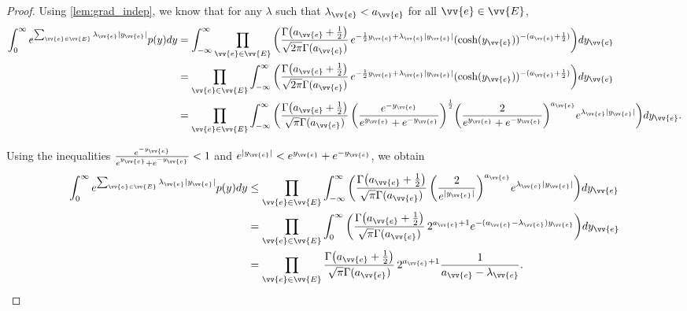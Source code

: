 \documentclass[a4paper, 11pt]{article}
\begin{document}
\begin{proof}

Using \cref{lem:grad_indep}, we know that for any $\lambda$ such that $\lambda_{\vv{e}} < a_{\vv{e}}$ for all $\vv{e} \in \vv{E}$,
\begin{equation*}
\begin{aligned}
    \int_0^\infty e^{\sum_{\vv{e} \in \vv{E}} \lambda_{\vv{e}} |y_{\vv{e}}|} p(y) dy
    &= \int_{-\infty}^\infty \prod_{\vv{e} \in \vv{E}} \bigg(\frac{\Gamma\big(a_{\vv{e}}+\frac{1}{2}\big)}{\sqrt{2\pi}\Gamma(a_{\vv{e}})} \, e^{-\frac{1}{2}y_{\vv{e}} + \lambda_{\vv{e}} |y_{\vv{e}}|} (\cosh(y_{\vv{e}}))^{-(a_{\vv{e}}+\frac{1}{2})}\bigg) dy_{\vv{e}} \\
    &= \prod_{\vv{e} \in \vv{E}} \int_{-\infty}^\infty \bigg(\frac{\Gamma\big(a_{\vv{e}}+\frac{1}{2}\big)}{\sqrt{2\pi}\Gamma(a_{\vv{e}})} \, e^{-\frac{1}{2}y_{\vv{e}} + \lambda_{\vv{e}} |y_{\vv{e}}|} (\cosh(y_{\vv{e}}))^{-(a_{\vv{e}}+\frac{1}{2})}\bigg) dy_{\vv{e}} \\
    &= \prod_{\vv{e} \in \vv{E}} \int_{-\infty}^\infty \bigg(\frac{\Gamma\big(a_{\vv{e}}+\frac{1}{2}\big)}{\sqrt{\pi}\Gamma(a_{\vv{e}})} \, \bigg(\frac{e^{-y_{\vv{e}}}}{e^{y_{\vv{e}}} + e^{-y_{\vv{e}}}}\bigg)^{\frac{1}{2}} \bigg(\frac{2}{e^{y_{\vv{e}}} + e^{-y_{\vv{e}}}}\bigg)^{a_{\vv{e}}} e^{\lambda_{\vv{e}} |y_{\vv{e}}|}\bigg) dy_{\vv{e}}.
\end{aligned}
\end{equation*}

Using the inequalities \( \frac{e^{-y_{\vv{e}}}}{e^{y_{\vv{e}}} + e^{-y_{\vv{e}}}} < 1 \) and \( e^{|y_{\vv{e}}|} < e^{y_{\vv{e}}} + e^{-y_{\vv{e}}} \), we obtain
\begin{equation*}
\begin{aligned}
\int_0^\infty e^{\sum_{\vv{e} \in \vv{E}} \lambda_{\vv{e}} |y_{\vv{e}}|} p(y) dy
    &\leq \prod_{\vv{e} \in \vv{E}} \int_{-\infty}^\infty \bigg(\frac{\Gamma\big(a_{\vv{e}}+\frac{1}{2}\big)}{\sqrt{\pi}\Gamma(a_{\vv{e}})} \, \bigg(\frac{2}{e^{|y_{\vv{e}}|}}\bigg)^{a_{\vv{e}}} e^{\lambda_{\vv{e}} |y_{\vv{e}}|}\bigg) dy_{\vv{e}} \\
    &= \prod_{\vv{e} \in \vv{E}} \int_0^\infty \bigg(\frac{\Gamma\big(a_{\vv{e}}+\frac{1}{2}\big)}{\sqrt{\pi}\Gamma(a_{\vv{e}})} \, 2^{a_{\vv{e}}+1} e^{-(a_{\vv{e}}-\lambda_{\vv{e}}) y_{\vv{e}}}\bigg) dy_{\vv{e}} \\
    &= \prod_{\vv{e} \in \vv{E}} \frac{\Gamma\big(a_{\vv{e}}+\frac{1}{2}\big)}{\sqrt{\pi}\Gamma(a_{\vv{e}})} \, 2^{a_{\vv{e}}+1} \frac{1}{a_{\vv{e}} - \lambda_{\vv{e}}}.
\end{aligned}
\end{equation*}


\end{proof}
\end{document}

